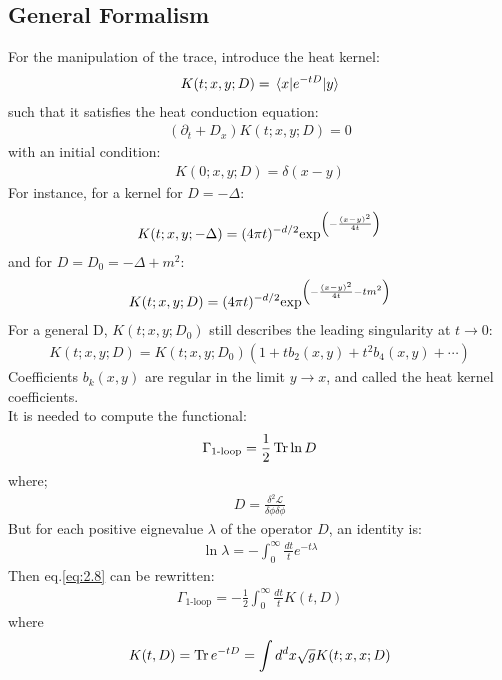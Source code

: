 \subsection{General Formalism}
For the manipulation of the trace, introduce the heat kernel:
\begin{align}
    K(t;x,y;D) = \mel{x}{e^{-tD}}{y}
\end{align}
such that it satisfies the heat conduction equation:
\begin{align}
    (\partial _{t} + D_{x})K(t;x,y;D) = 0
\end{align}
with an initial condition:
\begin{align}
    K(0;x,y;D) = \delta (x-y)
\end{align}
For instance, for a kernel for $ D = - \Delta$:
\begin{align}
    K(t;x,y;-\Delta) = (4\pi t)^{-d/2} \text{exp} ^{\qty (-\frac{(x-y)^2}{4t})}
\end{align}
and for $D = D_{0}= -\Delta +m^2 $:
\begin{align}
    K(t;x,y;D) = (4\pi t)^{-d/2} \text{exp}^{ \qty (-\frac{(x-y)^2}{4t} - tm^2)}
\end{align}
For a general D, $K(t;x,y;D_{0})$ still describes the leading singularity at $t \to 0$:
\begin{align}
    K(t;x,y;D) = K(t;x,y;D_{0}) (1 + tb_{2} (x,y) + t^{2} b_{4}(x,y) + \cdots)
\end{align}
Coefficients $b_{k} (x,y)$ are regular in the limit $y \to x$, and called the heat kernel coefficients. \\
\indent It is needed to compute the functional:
\begin{align}
    \Gamma_{\text{1-loop}} = \frac{1}{2} \Tr \ln D
\end{align}
where;
\begin{align}
    D = \frac{\delta^2 \mathcal{L}}{\delta \phi \delta \phi} 
\end{align}
But for each positive eignevalue $\lambda$ of the operator $D$, an identity is:
\begin{align}
    \ln \lambda = -\int _{0} ^{\infty} \frac{dt}{t} e^{-t\lambda}
\end{align}
Then eq.\ref{eq:2.8} can be rewritten:
\begin{align}
    \Gamma _{\text{1-loop}} = -\frac{1}{2} \int _{0}^{\infty} \frac{dt}{t} K(t,D)
\end{align}
where 
\begin{align}
    K(t,D) = \Tr e^{-tD} = \int d^{d} x \sqrt{g} K(t;x,x;D)
\end{align}
